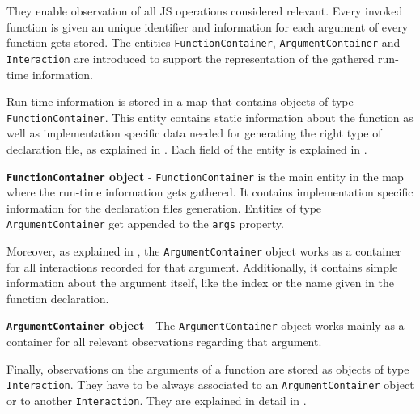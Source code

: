 They enable observation of all JS operations considered relevant. Every invoked function is given an unique identifier and information for each argument of every function gets stored. The entities \texttt{FunctionContainer}, \texttt{ArgumentContainer} and \texttt{Interaction} are introduced to support the representation of the gathered run-time information. 

Run-time information is stored in a map that contains objects of type \texttt{FunctionContainer}.
This entity contains static information about the function as well as implementation specific data needed for generating the right type of declaration file, as explained in . Each field of the entity is explained in .

\begin{code}
  \caption[FunctionContainer object]{\textbf{\texttt{FunctionContainer} object} - \texttt{FunctionContainer} is the main entity in the map where the run-time information gets gathered. It contains implementation specific information for the declaration files generation. Entities of type \texttt{ArgumentContainer} get appended to the \texttt{args} property.}
  \label{code:function-container}
\end{code}

Moreover, as explained in , the \texttt{ArgumentContainer} object works as a container for all interactions recorded for that argument. Additionally, it contains simple information about the argument itself, like the index or the name given in the function declaration.

\begin{code}
  \caption[ArgumentContainer object]{\textbf{\texttt{ArgumentContainer} object} - The \texttt{ArgumentContainer} object works mainly as a container for all relevant observations regarding that argument.}
  \label{code:argument-container}
\end{code}

Finally, observations on the arguments of a function are stored as objects of type \texttt{Interaction}. They have to be always associated to an \texttt{ArgumentContainer} object or to another \texttt{Interaction}. They are explained in detail in .

